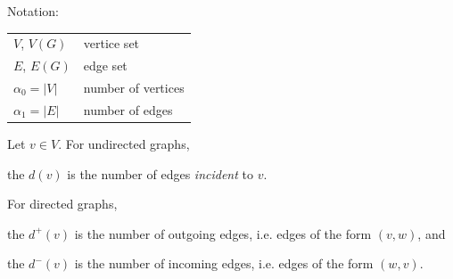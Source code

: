 Notation: \\[\medskipamount]
\begin{tabular}{ll}
  $V$, $V(G)$ & vertice set \\
  $E$, $E(G)$ & edge set \\
  $\alpha_0 = |V|$ & number of vertices \\
  $\alpha_1 = |E|$ & number of edges \\
\end{tabular}

\begin{definition}
Let $v\in V$. For undirected graphs,
\begin{compactitem}
  \item the  $d(v)$ is the number of edges \emph{incident} to $v$.
\end{compactitem}
For directed graphs,
\begin{compactitem}
  \item the  $d^{+}(v)$ is the number of outgoing edges, i.e. edges of the form $(v,w)$, and
  \item the  $d^{-}(v)$ is the number of incoming edges, i.e. edges of the form $(w,v)$.
\end{compactitem}
\end{definition}


